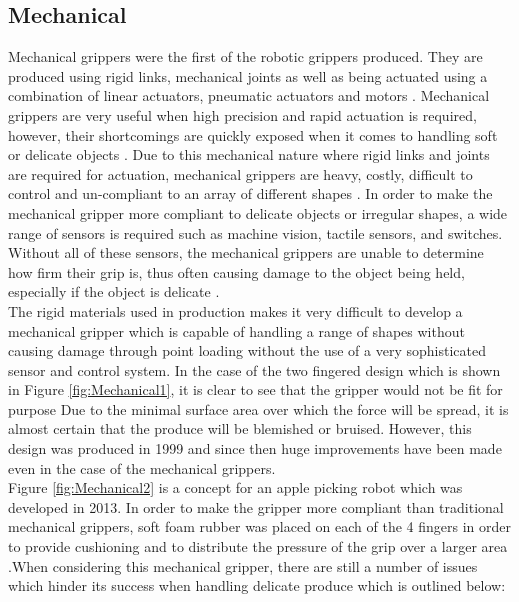 \documentclass[11pt,twocolumn]{article}
\begin{document}
\subsection{Mechanical}
Mechanical grippers were the first of the robotic grippers produced. They are produced using rigid links, mechanical joints as well as being actuated using a combination of linear actuators, pneumatic actuators and motors \cite{marchese2015recipe}. Mechanical grippers are very useful when high precision and rapid actuation is required, however, their shortcomings are quickly exposed when it comes to handling soft or delicate objects \cite{ilievski2011soft}. Due to this mechanical nature where rigid links and joints are required for actuation, mechanical grippers are heavy, costly, difficult to control and un-compliant to an array of different shapes \cite{martinez2014soft}. In order to make the mechanical gripper more compliant to delicate objects or irregular shapes, a wide range of sensors is required such as machine vision, tactile sensors, and switches. Without all of these sensors, the mechanical grippers are unable to determine how firm their grip is, thus often causing damage to the object being held, especially if the object is delicate \cite{ceccarelli2000designing}.
\\
\newline
The rigid materials used in production makes it very difficult to develop a mechanical gripper which is capable of handling a range of shapes without causing damage through point loading without the use of a very sophisticated sensor and control system. In the case of the two fingered design which is shown in Figure \ref{fig:Mechanical1}, it is clear to see that the gripper would not be fit for purpose Due to the minimal surface area over which the force will be spread, it is almost certain that the produce will be blemished or bruised. However, this design was produced in 1999 and since then huge improvements have been made even in the case of the mechanical grippers. 
\\
\newline
Figure \ref{fig:Mechanical2} is a concept for an apple picking robot which was developed in 2013. In order to make the gripper more compliant than traditional mechanical grippers, soft foam rubber was placed on each of the 4 fingers in order to provide cushioning and to distribute the pressure of the grip over a larger area \cite{chiu2013development}.When considering this mechanical gripper, there are still a number of issues which hinder its success when handling delicate produce which is outlined below:
\end{document}
